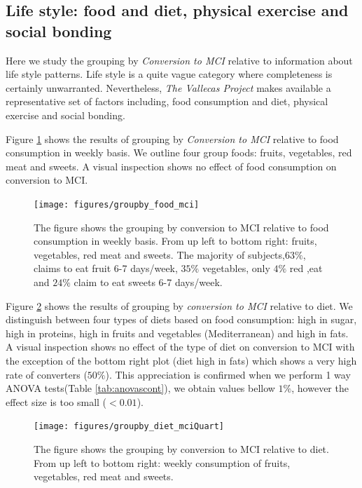 \documentclass[11pt]{article}
\theoremstyle{definition}
\theoremstyle{remark}
\begin{document}
\subsection{Life style: food and diet, physical exercise and social bonding}

Here we study the grouping by \emph{Conversion to MCI} relative to information about life style patterns. Life style is a quite vague category where completeness is certainly unwarranted. Nevertheless, \emph{The Vallecas Project} makes available a representative set of factors including, food consumption and diet, physical exercise and social bonding.

Figure \ref{fig:groupby_food_mci} shows the results of grouping by \emph{Conversion to MCI} relative to food consumption in weekly basis. We outline four group foods: fruits, vegetables, red meat and sweets. A visual inspection shows no effect of food consumption on conversion to MCI. %

\begin{figure}[!htb]
        \centering
        \texttt{[image: figures/groupby\_food\_mci]}
        \caption{The figure shows the grouping by conversion to MCI relative to food consumption in weekly basis. From up left to bottom right: fruits, vegetables, red meat and sweets. The majority of subjects,$63\%$, claims to eat fruit 6-7 days/week, $35\%$ vegetables, only $4\%$ red ,eat and $24\%$ claim to eat sweets 6-7 days/week.} 
        \label{fig:groupby_food_mci}
\end{figure}

Figure \ref{fig:groupby_diet_mciQuart} shows the results of grouping by \emph{conversion to MCI} relative to diet. We distinguish between four types of diets based on food consumption: high in sugar, high in proteins, high in fruits and vegetables (Mediterranean) and high in fats. A visual inspection shows no effect of the type of diet on conversion to MCI with the exception of the bottom right plot (diet high in fats) which shows a very high rate of converters ($50\%$). This appreciation is confirmed when we perform 1 way ANOVA tests(Table \ref{tab:anovascont}), we obtain values bellow $1\%$, however the effect size is too small ($<0.01$). 
\begin{figure}[!htb]
        \centering
        \texttt{[image: figures/groupby\_diet\_mciQuart]}
        \caption{The figure shows the grouping by conversion to MCI relative to diet. From up left to bottom right: weekly consumption of fruits, vegetables, red meat and sweets.} 
        \label{fig:groupby_diet_mciQuart}
\end{figure}
\end{document}
